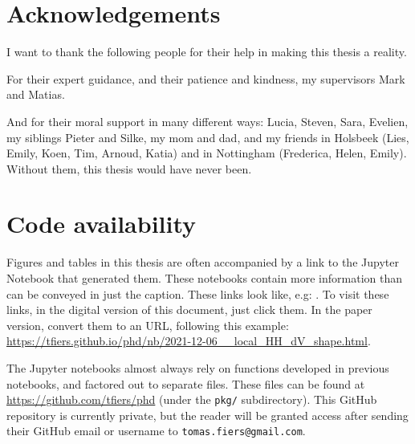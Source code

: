 

\chapter*{Acknowledgements}

I want to thank the following people for their help in making this thesis a reality.

For their expert guidance, and their patience and kindness, my supervisors Mark and Matias.

And for their moral support in many different ways:
Lucia, Steven, Sara, Evelien, my siblings Pieter and Silke, my mom and dad, and my friends in Holsbeek (Lies, Emily, Koen, Tim, Arnoud, Katia) and in Nottingham (Frederica, Helen, Emily).
Without them, this thesis would have never been.


\chapter*{Code availability}

Figures and tables in this thesis are often accompanied by a link to the Jupyter Notebook that generated them. These notebooks contain more information than can be conveyed in just the caption. These links look like, e.g:
.
To visit these links, in the digital version of this document, just click them. In the paper version, convert them to an URL, following this example: {\small \url{https://tfiers.github.io/phd/nb/2021-12-06__local_HH_dV_shape.html}}.

The Jupyter notebooks almost always rely on functions developed in previous notebooks, and factored out to separate files. These files can be found at \url{https://github.com/tfiers/phd} (under the \texttt{pkg/} subdirectory). This GitHub repository is currently private, but the reader will be granted access after sending their GitHub email or username to \texttt{tomas.fiers@gmail.com}.
